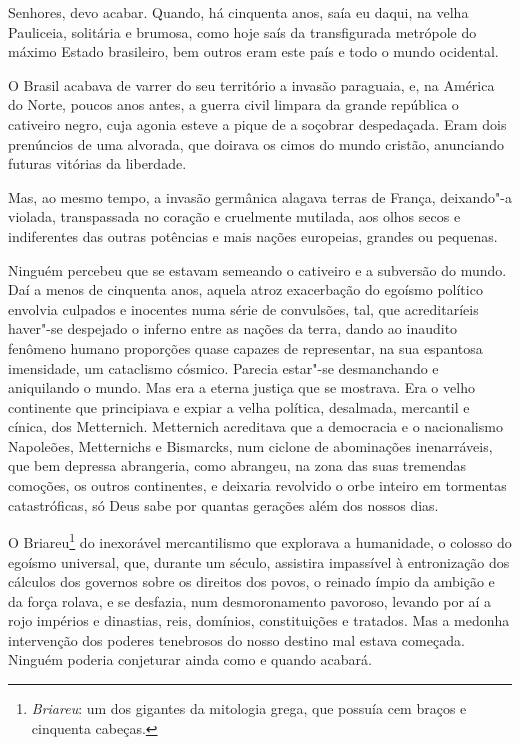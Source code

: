 Senhores, devo acabar. Quando, há cinquenta anos, saía eu daqui,
na velha Pauliceia, solitária e brumosa, como hoje saís da
transfigurada metrópole do máximo Estado brasileiro, bem outros eram
este país e todo o mundo ocidental.

O Brasil acabava de varrer do seu território a invasão
paraguaia, e, na América do Norte,
poucos anos antes, a guerra civil limpara
da grande república o cativeiro negro, cuja agonia esteve a pique de a
soçobrar despedaçada. Eram dois prenúncios de uma alvorada, que doirava
os cimos do mundo cristão, anunciando futuras vitórias da liberdade.

Mas, ao mesmo tempo, a invasão germânica alagava terras de França,
deixando"-a violada, transpassada no coração e cruelmente mutilada, aos
olhos secos e indiferentes das outras potências e mais nações
europeias, grandes ou pequenas.

Ninguém percebeu que se estavam semeando o cativeiro e a subversão
do mundo. Daí a menos de cinquenta anos, aquela atroz exacerbação do
egoísmo político envolvia culpados e inocentes numa série de
convulsões, tal, que acreditaríeis haver"-se despejado o inferno entre
as nações da terra, dando ao inaudito fenômeno humano proporções quase
capazes de representar, na sua espantosa imensidade, um cataclismo
cósmico. Parecia estar"-se desmanchando e aniquilando o mundo. Mas era a
eterna justiça que se mostrava. Era o velho continente que principiava
e expiar a velha política, desalmada, mercantil e cínica, dos
Metternich. Metternich acreditava que a democracia e o nacionalismo
Napoleões, Metternichs
e Bismarcks, num ciclone de abominações 
inenarráveis, que bem depressa abrangeria, como
abrangeu, na zona das suas tremendas comoções, os outros continentes, e
deixaria revolvido o orbe inteiro em tormentas catastróficas, só Deus
sabe por quantas gerações além dos nossos dias.

O Briareu\footnote{\emph{Briareu}: um dos gigantes da mitologia grega, que possuía cem
braços e cinquenta cabeças.} do
inexorável mercantilismo que explorava a humanidade, o colosso do
egoísmo universal, que, durante um século, assistira impassível à
entronização dos cálculos dos governos sobre os direitos dos povos, o
reinado ímpio da ambição e da força rolava, e se desfazia, num
desmoronamento pavoroso, levando por aí a rojo impérios e dinastias,
reis, domínios, constituições e tratados. Mas a medonha intervenção dos
poderes tenebrosos do nosso destino mal estava começada. Ninguém
poderia conjeturar ainda como e quando acabará.

